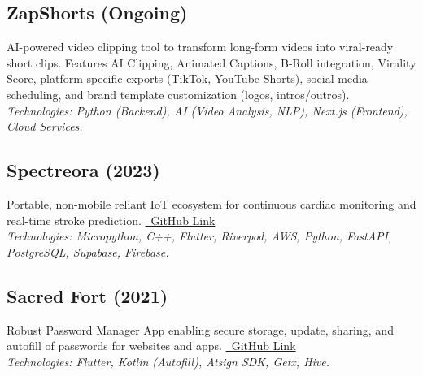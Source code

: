 \documentclass[10pt,letterpaper]{article} %
\begin{document}
\subsection*{ZapShorts (Ongoing)}
\noindent AI-powered video clipping tool to transform long-form videos into viral-ready short clips. Features AI Clipping, Animated Captions, B-Roll integration, Virality Score, platform-specific exports (TikTok, YouTube Shorts), social media scheduling, and brand template customization (logos, intros/outros). \\
\textit{Technologies: Python (Backend), AI (Video Analysis, NLP), Next.js (Frontend), Cloud Services.}
\vspace{0.5ex}


\subsection*{Spectreora (2023)}
\noindent Portable, non-mobile reliant IoT ecosystem for continuous cardiac monitoring and real-time stroke prediction. \href{https://github.com/Intiserahmed/SpectreOra-IoT-Mobile-ML}{\faGithubSquare~GitHub Link} \\
\textit{Technologies: Micropython, C++, Flutter, Riverpod, AWS, Python, FastAPI, PostgreSQL, Supabase, Firebase.}
\vspace{0.5ex}

\subsection*{Sacred Fort (2021)}
\noindent Robust Password Manager App enabling secure storage, update, sharing, and autofill of passwords for websites and apps. \href{https://github.com/Intiserahmed/Password-Manager-Atsign}{\faGithubSquare~GitHub Link} \\
\textit{Technologies: Flutter, Kotlin (Autofill), Atsign SDK, Getx, Hive.}
\vspace{0.5ex}
\end{document}
